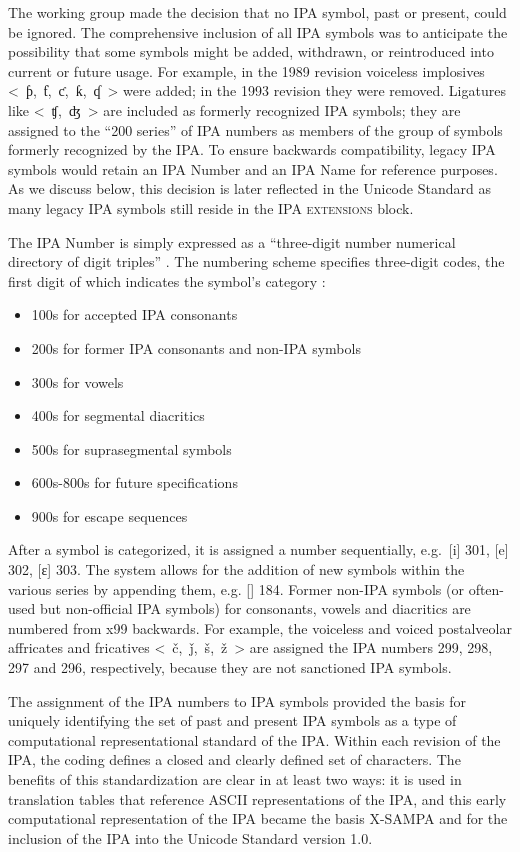 The working group made the decision that no IPA symbol, past or present, 
could be ignored. The comprehensive inclusion of all IPA symbols was to 
anticipate the possibility that some symbols might be added, withdrawn, 
or reintroduced into current or future usage. For example, in the 1989 
revision voiceless implosives <~ƥ,~ƭ,~ƈ,~ƙ,~ʠ~> were added; in the 1993 
revision they were removed. Ligatures like <~ʧ,~ʤ~> are included as formerly 
recognized IPA symbols; they are assigned to the ``200 series'' of IPA numbers 
as members of the group of symbols formerly recognized by the IPA. To ensure 
backwards compatibility, legacy IPA symbols would retain an IPA Number and 
an IPA Name for reference purposes. As we discuss below, this decision is 
later reflected in the Unicode Standard as many legacy IPA symbols still reside in 
the \textsc{IPA extensions} block.

The IPA Number is simply expressed as a ``three-digit number numerical directory
of digit triples'' \cite{}. The numbering scheme specifies three-digit codes,
the first digit of which indicates the symbol's category
\citep{Esling1990,EslingGaylord1993}:

\begin{itemize}
	\item 100s for accepted IPA consonants
	\item 200s for former IPA consonants and non-IPA symbols
	\item 300s for vowels
	\item 400s for segmental diacritics
	\item 500s for suprasegmental symbols
	\item 600s-800s for future specifications
	\item 900s for escape sequences
\end{itemize}

After a symbol is categorized, it is assigned a number sequentially, e.g.\ [i]
301, [e] 302, [ɛ] 303. The system allows for the addition of new symbols within
the various series by appending them, e.g. [] 184. Former non-IPA
symbols (or often-used but non-official IPA symbols) for consonants, vowels and
diacritics are numbered from x99 backwards. For example, the voiceless and
voiced postalveolar affricates and fricatives <~č,~ǰ,~š,~ž~> are assigned the
IPA numbers 299, 298, 297 and 296, respectively, because they are not sanctioned
IPA symbols.

The assignment of the IPA numbers to IPA symbols provided the basis for uniquely
identifying the set of past and present IPA symbols as a type of computational
representational standard of the IPA. Within each revision of the IPA, the
coding defines a closed and clearly defined set of characters. The benefits of
this standardization are clear in at least two ways: it is used in translation
tables that reference ASCII representations of the IPA, and this early
computational representation of the IPA became the basis X-SAMPA and for the
inclusion of the IPA into the Unicode Standard version 1.0.

